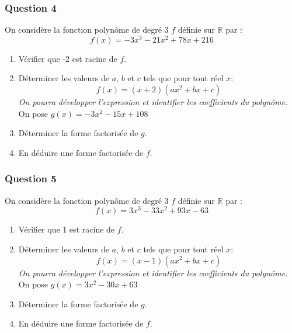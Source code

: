 \documentclass[15pt, mathserif]{beamer}
\newcommand{\R}{\mathbb{R}}			%
\begin{document}
\begin{frame} 
	\frametitle{Question 4}
On considère la fonction polynôme de degré 3 $f$ définie sur $\R$ par : $$f(x)=-3x^3-21x^2+78x+216$$
 
 \begin{enumerate} 
 	 \item Vérifier que -2 est racine de $f$. 
 	 \item Déterminer les valeurs de $a$, $b$ et $c$ tels que pour tout réel $x$: $$f(x)=(x+2)(ax^2+bx+c)$$ 
 	 \textit{On pourra développer l'expression et identifier les coefficients du polynôme.} 
 \medskip 
 	 On pose $g(x)=-3x^2-15x+108$
 	 \item Déterminer la forme factorisée de $g$. 
 	 \item En déduire une forme factorisée de $f$.
 
 \end{enumerate} 
 \end{frame}


\begin{frame} 
	\frametitle{Question 5}
On considère la fonction polynôme de degré 3 $f$ définie sur $\R$ par : $$f(x)=3x^3-33x^2+93x-63$$
 
 \begin{enumerate} 
 	 \item Vérifier que 1 est racine de $f$. 
 	 \item Déterminer les valeurs de $a$, $b$ et $c$ tels que pour tout réel $x$: $$f(x)=(x-1)(ax^2+bx+c)$$ 
 	 \textit{On pourra développer l'expression et identifier les coefficients du polynôme.} 
 \medskip 
 	 On pose $g(x)=3x^2-30x+63$
 	 \item Déterminer la forme factorisée de $g$. 
 	 \item En déduire une forme factorisée de $f$.
 
 \end{enumerate} 
 \end{frame}
\end{document}
